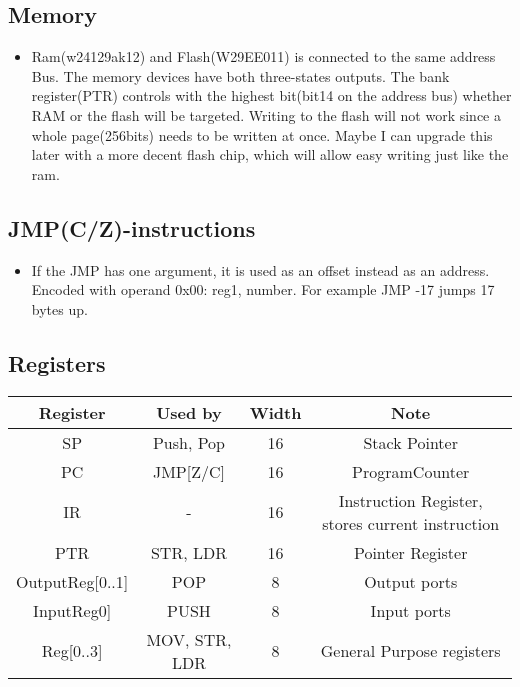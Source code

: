 \documentclass[a4paper, 12pt]{article}
\begin{document}
	\subsection{Memory}
	\begin{itemize}
		\item Ram(w24129ak12) and Flash(W29EE011) is connected to the same address Bus. The memory devices have both three-states outputs. The bank register(PTR) controls with the highest bit(bit14 on the address bus) whether RAM or the flash will be targeted. Writing to the flash will not work since a whole page(256bits) needs to be written at once. Maybe I can upgrade this later with a more decent flash chip, which will allow easy writing just like the ram.
	\end{itemize}

	\subsection{JMP(C/Z)-instructions}
	\begin{itemize}
		\item If the JMP has one argument, it is used as an offset instead as an address. Encoded with operand 0x00: reg1, number.\newline
			For example JMP -17 jumps 17 bytes up.
	\end{itemize}

	\subsection {Registers}
	\small\begin{center}
		\begin{tabular}{|c|c|c|c|}
			\hline
			Register & Used by & Width & Note\\ \hline
			SP & Push, Pop & 16 & Stack Pointer\\ \hline
			PC & JMP[Z/C] & 16 & ProgramCounter\\ \hline
			IR & - & 16 & Instruction Register, stores current instruction\\ \hline
			PTR & STR, LDR & 16 & Pointer Register\\\hline
			OutputReg[0..1] & POP & 8 & Output ports\\ \hline
			InputReg0] & PUSH & 8 & Input ports\\ \hline
			Reg[0..3] & MOV, STR, LDR & 8 & General Purpose registers\\ \hline
		\end{tabular}
	\end{center}
	\newpage
\end{document}
